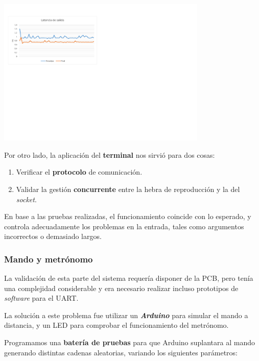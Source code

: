 \documentclass[10pt,a4paper]{article}
\begin{document}
	\begin{center}
		\includegraphics[width=0.75\textwidth]{images/lat_gpio} 
	\end{center}
	
	Por otro lado, la aplicación del \textbf{terminal} nos sirvió para dos cosas:
	
	\begin{enumerate}
		\item Verificar el \textbf{protocolo} de comunicación.
		\item Validar la gestión \textbf{concurrente} entre la hebra de reproducción y la del \textit{socket}.
	\end{enumerate}
	
	En base a las pruebas realizadas, el funcionamiento coincide con lo esperado, y controla adecuadamente los problemas en la entrada, tales como argumentos incorrectos o demasiado largos.
	
	\subsubsection*{Mando y metrónomo}
	
	La validación de esta parte del sistema requería disponer de la PCB, pero tenía una complejidad considerable y era necesario realizar incluso prototipos de \textit{software} para el UART.
	
	La solución a este problema fue utilizar un \textbf{\textit{Arduino}} para simular el mando a distancia, y un LED para comprobar el funcionamiento del metrónomo.
	
	Programamos una \textbf{batería de pruebas} para que Arduino suplantara al mando generando distintas cadenas aleatorias, variando los siguientes parámetros:
	
	\clearpage
	
\end{document}
